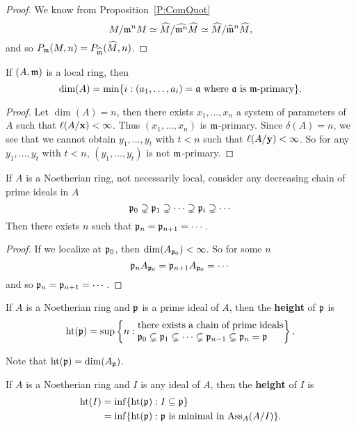 \documentclass{ximera}
\begin{document}
\begin{proof} We know from Proposition~\ref{P:ComQuot}
\[
M/\mathfrak{m}^n M \simeq \widehat{M}/\widehat{\mathfrak{m}^n} \widehat{M} \simeq \widehat{M}/ \widehat{\mathfrak{m}}^n\widehat{M},
\]
and so $P_{\mathfrak{m}}(M,n) = P_{\widehat{\mathfrak{m}}}(\widehat{M},n)$.
\end{proof}


\begin{corollary} If $(A,\mathfrak{m})$ is a local ring, then 
\[
\dim(A) = \min\{i: (a_1,\dots,a_i) = \mathfrak{a}\text{ where $\mathfrak{a}$ is $\mathfrak{m}$-primary}\}.
\]
\end{corollary}

\begin{proof} Let $\dim(A) = n$, then there exists $x_1,\dots,x_n$ a system of parameters of $A$ such that $\ell(A/\mathbf{x}) <\infty$. Thus $(x_1,\dots,x_n)$ is $\mathfrak{m}$-primary.  Since $\delta(A) = n$, we see that we cannot obtain $y_1,\dots,y_t$ with $t<n$ such that $\ell(A/\mathbf{y})<\infty$.  So for any $y_1,\ldots,y_t$ with $t < n$, $(y_1,\ldots,y_t)$ is not $\mathfrak{m}$-primary.
\end{proof}


\begin{corollary} If $A$ is a Noetherian ring, not necessarily local, consider any decreasing chain of prime ideals in $A$ 
\[
\mathfrak{p}_0\supsetneq \mathfrak{p}_1\supsetneq \cdots \supsetneq \mathfrak{p}_i\supsetneq \cdots
\]
Then there exists $n$ such that $\mathfrak{p}_n = \mathfrak{p}_{n+1} = \cdots$.
\end{corollary}

\begin{proof} If we localize at $\mathfrak{p}_0$, then $\dim(A_{\mathfrak{p}_0}) <\infty$.  So for some $n$
\[
\mathfrak{p}_n A_{\mathfrak{p}_0} = \mathfrak{p}_{n+1} A_{\mathfrak{p}_0} = \cdots
\]
and so $\mathfrak{p}_n = \mathfrak{p}_{n+1} = \cdots$.
\end{proof}

\begin{definition} If $A$ is a Noetherian ring and $\mathfrak{p}$ is a prime ideal of $A$, then the \textbf{height} of $\mathfrak{p}$ is 
\[
\h(\p) = \sup\left\{n : \begin{minipage}{15em}there exists a chain of prime ideals $\p_0\subsetneq \p_1 \subsetneq \cdots \subsetneq \p_{n-1}\subsetneq \p_n =\p$\end{minipage} \right\}.
\]
\end{definition}

\begin{remark} Note that $\operatorname{ht}(\mathfrak{p}) = \dim(A_{\mathfrak{p}})$.
\end{remark}

\begin{definition} If $A$ is a Noetherian ring and $I$ is any ideal of $A$, then the \textbf{height} of $I$ is 
\begin{align*}
\operatorname{ht}(I) &= \inf\{\operatorname{ht}(\mathfrak{p}): I\subseteq\mathfrak{p}\} \\
&= \inf\{\operatorname{ht}(\mathfrak{p}): \mathfrak{p} \text{ is minimal in $\operatorname{Ass}_A(A/I)$}\}.
\end{align*}
\end{definition}
\end{document}

